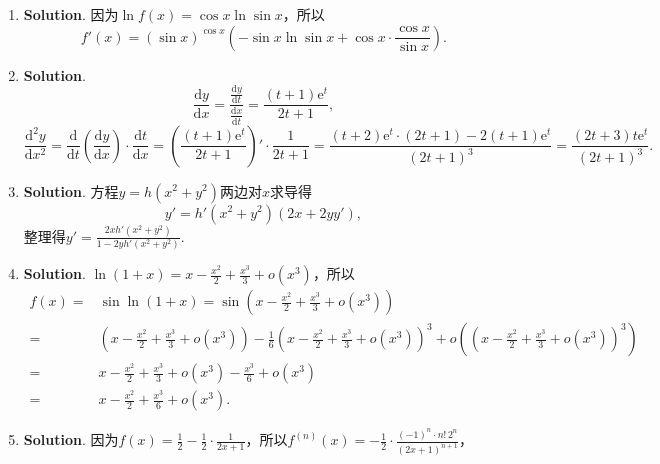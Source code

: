 \documentclass[../main.tex]{subfiles}
\begin{document}
\begin{enumerate}
    \item \textbf{Solution}. 因为$\ln f(x) =\cos x\ln\sin x$，所以
          \[
              f'(x)=\left(\sin x
              \right)^{\cos x}\left(-\sin x\ln\sin x+\cos x\cdot\frac{\cos x}{\sin x}\right
              ).
          \]

    \item \textbf{Solution}.
          \[
              \frac{\mathrm{d}y}{\mathrm{d}x}=\frac{\frac{\mathrm{d}y}{\mathrm{d}t}}{\frac{\mathrm{d}x}{\mathrm{d}t}}
              =\frac{(t+1)\mathrm{e}^{t}}{2t+1},
          \]
          \[
              \frac{\mathrm{d}^{2}y}{\mathrm{d}x^{2}}=\frac{\mathrm{d}}{\mathrm{d}t}\left
              (\frac{\mathrm{d}y}{\mathrm{d}x}\right)\cdot\frac{\mathrm{d}t}{\mathrm{d}x}
              =\left(\frac{(t+1)\mathrm{e}^{t}}{2t+1}\right)'\cdot\frac{1}{2t+1}=\frac{(t+2)\mathrm{e}^{t}\cdot(2t+1)-2(t+1)\mathrm{e}^{t}}{(2t+1)^{3}}
              =\frac{(2t+3)t\mathrm{e}^{t}}{(2t+1)^{3}}.
          \]

    \item \textbf{Solution}. 方程$y=h(x^{2}+y^{2})$两边对$x$求导得
          \[
              y'=h'(x^{2}+y^{2})(2x+2yy'),
          \]
          整理得$y'=\frac{2xh'(x^{2}+y^{2})}{1-2yh'(x^{2}+y^{2})}$.

    \item \textbf{Solution}. $\ln(1+x)=x-\frac{x^{2}}{2}+\frac{x^{3}}{3}+o(x^{3})$，所以
          \[
              \begin{aligned}
                  f(x) = {} & \sin\ln(1+x)=\sin\left(x-\frac{x^2}{2}+\frac{x^3}{3}+o(x^{3})\right)                                                                                                                         \\
                  = {}      & \left(x-\frac{x^2}{2}+\frac{x^3}{3}+o(x^{3})\right)-\frac{1}{6}\left(x-\frac{x^2}{2}+\frac{x^3}{3}+o(x^{3})\right)^{3}+o\left(\left(x-\frac{x^2}{2}+\frac{x^3}{3}+o(x^{3})\right)^{3}\right) \\
                  = {}      & x-\frac{x^2}{2}+\frac{x^3}{3}+o(x^{3})-\frac{x^3}{6}+o(x^{3})                                                                                                                                \\
                  = {}      & x-\frac{x^2}{2}+\frac{x^3}{6}+o(x^{3}).
              \end{aligned}
          \]

    \item \textbf{Solution}. 因为$f(x)=\frac{1}{2}-\frac{1}{2}\cdot\frac{1}{2x+1}$，所以$f
                  ^{(n)}(x)=-\frac{1}{2}\cdot\frac{(-1)^{n}\cdot n!\,2^{n}}{(2x+1)^{n+1}}$，


\end{enumerate}
\end{document}
